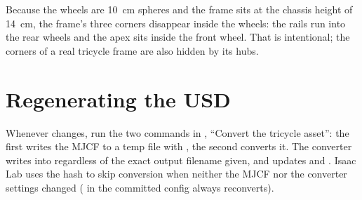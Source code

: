 Because the wheels are 10~cm spheres and the frame sits at the chassis height
of 14~cm, the frame's three corners disappear inside the wheels: the rails
run into the rear wheels and the apex sits inside the front wheel. That is
intentional; the corners of a real tricycle frame are also hidden by its hubs.

\section{Regenerating the USD}

Whenever  changes, run the two commands in
, ``Convert the tricycle asset'': the first writes the MJCF
to a temp file with , the second converts it. The converter
writes into  regardless of the exact
output filename given, and updates  and
. Isaac Lab uses the hash to skip conversion when
neither the MJCF nor the converter settings changed
( in the committed config always
reconverts).
